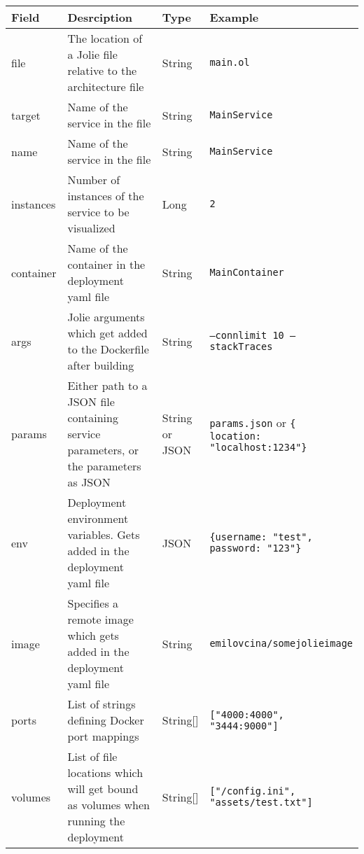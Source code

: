 \begin{table}[h]
    \advance
    \leftskip-1.2cm
    \begin{tabular}{p{0.12\linewidth} | p{0.48\linewidth} | p{0.1\linewidth} | p{0.30\linewidth}}
    \toprule
    \textbf{Field}           & \textbf{Desrciption} & \textbf{Type} & \textbf{Example} \\ \midrule
    file                 & The location of a Jolie file relative to the architecture file & String & \texttt{main.ol} \\\midrule
    target & Name of the service in the file & String & \texttt{MainService}\\\midrule
    name& Name of the service in the file  & String & \texttt{MainService} \\\midrule
    instances & Number of instances of the service to be visualized  & Long & \texttt{2}\\\midrule
    container& Name of the container in the deployment yaml file & String & \texttt{MainContainer}\\\midrule
    args& Jolie arguments which get added to the Dockerfile after building  & String & \texttt{--connlimit 10 --stackTraces}\\\midrule
    params& Either path to a JSON file containing service parameters, or the parameters as JSON & String or JSON & \texttt{params.json} or \texttt{\{ location: "localhost:1234"\}}\\\midrule
    env& Deployment environment variables. Gets added in the deployment yaml file & JSON & \texttt{\{username: "test", password: "123"\}} \\\midrule
    image           & Specifies a remote image which gets added in the deployment yaml file & String & \texttt{emilovcina/somejolieimage}\\\midrule
    ports             & List of strings defining Docker port mappings & String[] & \texttt{["4000:4000", "3444:9000"]}\\\midrule 
    volumes              & List of file locations which will get bound as volumes when running the deployment & String[] & \texttt{["/config.ini", "assets/test.txt"]}\\\midrule
    \end{tabular}
    \end{table}